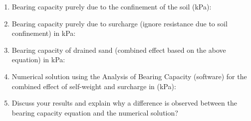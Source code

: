 \documentclass[a4paper,12pt]{article}
\begin{document}
\begin{enumerate}
\item Bearing capacity purely due to the confinement of the soil (kPa): %
\item Bearing capacity purely due to surcharge (ignore resistance due to soil confinement) in kPa: %
\item Bearing capacity of drained sand (combined effect based on the above equation) in kPa: %
\item Numerical solution using the Analysis of Bearing Capacity (software) for the combined effect of self-weight and surcharge in (kPa): %
  \item Discuss your results and explain why a difference is observed between the bearing capacity equation and the numerical solution?



  \end{enumerate}
\end{document}
